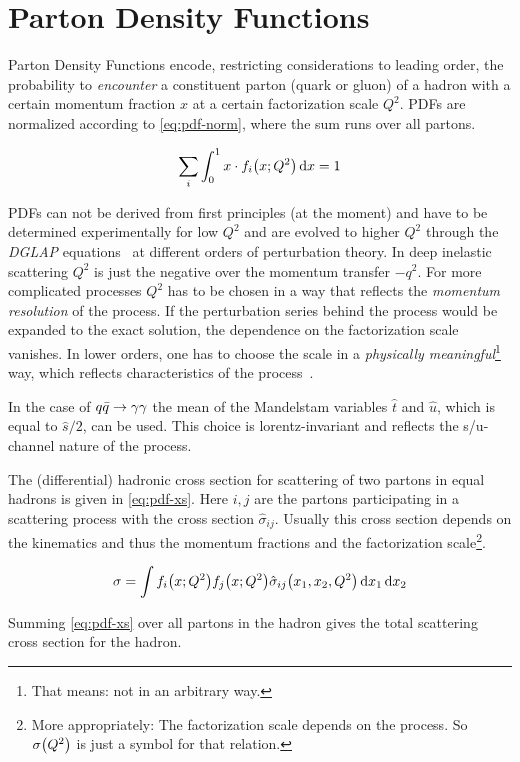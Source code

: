 \section{Parton Density Functions}%
\label{sec:pdf_basics}

Parton Density Functions encode, restricting considerations to leading
order, the probability to \emph{encounter} a constituent parton (quark
or gluon) of a hadron with a certain momentum fraction \(x\) at a
certain factorization scale \(Q^2\). PDFs are normalized according to
\cref{eq:pdf-norm}, where the sum runs over all partons.

\begin{equation}
  \label{eq:pdf-norm}
  \sum_i\int_0^1x\cdot f_i\qty(x;Q^2) \dd{x} = 1
\end{equation}


PDFs can not be derived from first principles (at the moment) and have
to be determined experimentally for low \(Q^2\) and are evolved to
higher \(Q^2\) through the \emph{DGLAP}
equations~\cite{altarelli:1977af} at different orders of perturbation
theory.  In deep inelastic scattering \(Q^2\) is just the negative
over the momentum transfer \(-q^2\). For more complicated processes
\(Q^2\) has to be chosen in a way that reflects the \emph{momentum
  resolution} of the process. If the perturbation series behind the
process would be expanded to the exact solution, the dependence on the
factorization scale vanishes. In lower orders, one has to choose the
scale in a \emph{physically meaningful}\footnote{That means: not in
  an arbitrary way.} way, which reflects characteristics of the
process~\cite{altarelli:1977af}.

In the case of \(q\bar{q}\rightarrow\gamma\gamma\) the mean of the Mandelstam variables \(\hat{t}\)
and \(\hat{u}\), which is equal to \(\hat{s}/2\), can be used. This
choice is lorentz-invariant and reflects the s/u-channel nature of the
process.

The (differential) hadronic cross section for scattering of two
partons in equal hadrons is given in \cref{eq:pdf-xs}. Here \(i,j\)
are the partons participating in a scattering process with the cross
section \(\hat{\sigma}_{ij}\). Usually this cross section depends on
the kinematics and thus the momentum fractions and the factorization
scale\footnote{More appropriately: The factorization scale depends on
  the process. So \(\sigma\qty(Q^2)\) is just a symbol for that
  relation.}.

\begin{equation}
  \label{eq:pdf-xs}
  \sigma = \int f_i\qty(x;Q^2) f_j\qty(x;Q^2) \hat{\sigma}_{ij}\qty(x_1,
  x_2, Q^2)\dd{x_1}\dd{x_2}
\end{equation}

Summing \cref{eq:pdf-xs} over all partons in the hadron gives
the total scattering cross section for the hadron.

